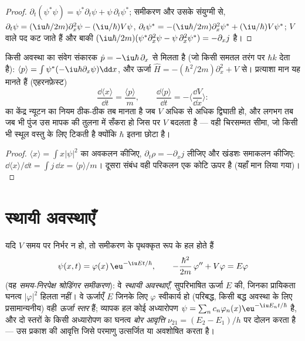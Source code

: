 \begin{proof}
$\partial_t(\psi^*\psi) = \psi^*\partial_t\psi + \psi\,\partial_t\psi^*$;
समीकरण और उसके संयुग्मी से, $\partial_t\psi = (\iu\hbar/2m)\partial_x^2\psi -
(\iu/\hbar)V\psi$, $\partial_t\psi^* = -(\iu\hbar/2m)\partial_x^2\psi^* +
(\iu/\hbar)V\psi^*$; $V$ वाले पद कट जाते हैं और बाकी $(\iu\hbar/2m)(\psi^*
\partial_x^2\psi - \psi\,\partial_x^2\psi^*) = -\partial_xj$ है।
\end{proof}

\begin{proposition}[संवेग, प्रत्याशा मान और चिरसम्मत सीमा]\label{prop:b2:schrodinger-wave-functions:ehrenfest}
किसी अवस्था का संवेग संकारक $\hat p =
-\iu\hbar\,\partial_x$ से मिलता है (जो किसी समतल तरंग पर $\hbar k$ देता है): $\langle
p\rangle = \int\psi^*(-\iu\hbar\partial_x\psi)\dd x$, और ऊर्जा $\hat H
= -(\hbar^2/2m)\partial_x^2 + V$ से। प्रत्याशा मान यह मानते हैं
(एहरनफ़ेस्ट)
\[
\frac{\dd\langle x\rangle}{\dd t} = \frac{\langle p\rangle}{m}, \qquad
\frac{\dd\langle p\rangle}{\dd t} = -\Big\langle\frac{\dd V}{\dd x}\Big\rangle :
\]
 का केंद्र न्यूटन का नियम ठीक-ठीक तब मानता है जब $V$
अधिक से अधिक द्विघाती हो, और लगभग तब जब भी पुंज उस मापक की तुलना में
सँकरा हो जिस पर $V$ बदलता है --- वही चिरसम्मत सीमा,
जो किसी भी स्थूल वस्तु के लिए टिकती है क्योंकि $\hbar$ इतना छोटा है।
\end{proposition}

\begin{proof}
$\langle x\rangle = \int x|\psi|^2$ का अवकलन कीजिए, $\partial_t\rho =
-\partial_xj$ लीजिए और खंडशः समाकलन कीजिए: $\dd\langle x\rangle/\dd t = \int j\,\dd x
= \langle p\rangle/m$। दूसरा संबंध वही परिकलन एक
कोटि ऊपर है (यहाँ मान लिया गया)।
\end{proof}

\section{स्थायी अवस्थाएँ}

\begin{theorem}[स्थायी अवस्थाएँ]\label{thm:b2:schrodinger-wave-functions:stationary}
यदि $V$ समय पर निर्भर न हो, तो समीकरण के
पृथक्कृत रूप के हल होते हैं
\[
\psi(x,t) = \varphi(x)\,\eu^{-\iu Et/\hbar}, \qquad
-\frac{\hbar^2}{2m}\,\varphi'' + V\varphi = E\varphi
\]
(वह \emph{समय-निरपेक्ष श्रोडिंगर समीकरण}): वे \emph{स्थायी अवस्थाएँ}, सुपरिभाषित ऊर्जा $E$ की, जिनका प्रायिकता घनत्व
$|\varphi|^2$ हिलता नहीं। वे ऊर्जाएँ $E$ जिनके लिए $\varphi$
स्वीकार्य हो (परिबद्ध, किसी बद्ध अवस्था के लिए प्रसामान्यनीय) वही
\emph{ऊर्जा स्तर} हैं; व्यापक हल कोई अध्यारोपण $\psi =
\sum_nc_n\varphi_n(x)\eu^{-\iu E_nt/\hbar}$ है, और दो स्तरों के किसी अध्यारोपण का
घनत्व \emph{बोर आवृत्ति} $\nu_{21} = (E_2 - E_1)/h$ पर दोलन करता है --- उस प्रकाश की आवृत्ति जिसे
परमाणु उत्सर्जित या अवशोषित करता है।
\end{theorem}

